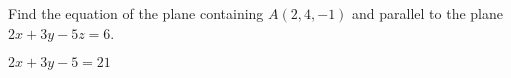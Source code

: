 
\begin{Exercise}[
name={},
title={}, 
difficulty=0,
origin={\cite{SM}}]
Find the equation of the plane containing $A(2,4,-1)$ and parallel to the plane $2x+3y-5z=6$.
\end{Exercise}

\begin{Answer}
$2x+3y-5=21$
\end{Answer}
